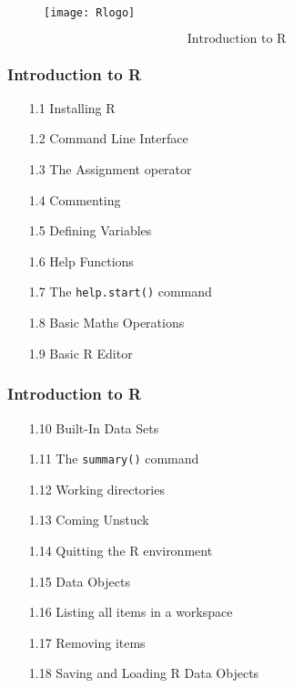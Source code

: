 \documentclass{beamer}
\begin{document}
 	\begin{frame}[fragile]
 		\begin{figure}
 			\centering
 			\texttt{[image: Rlogo]}
 		\end{figure}
 		\[ \mbox{Introduction to R} \]	
 	\end{frame}
 	

 	
 	\begin{frame}
 		\frametitle{Introduction to R}
 		\begin{itemize}
 			\item[1.1] Installing R      
 			\item[1.2] Command Line Interface     
 			\item[1.3] The Assignment operator     
 			\item[1.4] Commenting      
 			\item[1.5] Defining Variables     
 			\item[1.6] Help Functions      
 			\item[1.7] The \texttt{help.start()} command     
 			\item[1.8] Basic Maths Operations     
 			\item[1.9] Basic R Editor      
 		\end{itemize}
 	\end{frame}
 	
 	\begin{frame}
 		\frametitle{Introduction to R}
 		\begin{itemize}
 			\item[1.10] Built-In Data Sets      
 			\item[1.11] The \texttt{summary()} command     
 			\item[1.12] Working directories      
 			\item[1.13] Coming Unstuck    
 			\item[1.14] Quitting the R environment   
 			\item[1.15] Data Objects  
 			\item[1.16] Listing all items in a workspace     
 			\item[1.17] Removing items   
 			\item[1.18] Saving and Loading R Data Objects    
 		\end{itemize}
 	\end{frame}
 	
\end{document}
